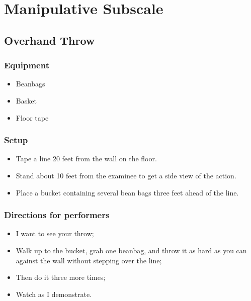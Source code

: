 \documentclass[
  letterpaper,
  DIV=11,
  numbers=noendperiod]{scrreprt}
\providecommand{\tightlist}{%
  \setlength{\itemsep}{0pt}\setlength{\parskip}{0pt}}
\begin{document}
\chapter{Manipulative Subscale}\label{manipulative-subscale}

\section{Overhand Throw}\label{overhand-throw}

\subsection{Equipment}\label{equipment-1}

\begin{itemize}
\tightlist
\item
  Beanbags
\item
  Basket
\item
  Floor tape
\end{itemize}

\subsection{Setup}\label{setup}

\begin{itemize}
\tightlist
\item
  Tape a line 20 feet from the wall on the floor.
\item
  Stand about 10 feet from the examinee to get a side view of the
  action.
\item
  Place a bucket containing several bean bags three feet ahead of the
  line.
\end{itemize}

\subsection{Directions for performers}\label{directions-for-performers}

\begin{itemize}
\tightlist
\item
  I want to see your throw;
\item
  Walk up to the bucket, grab one beanbag, and throw it as hard as you
  can against the wall without stepping over the line;
\item
  Then do it three more times;
\item
  Watch as I demonstrate.
\end{itemize}
\end{document}
